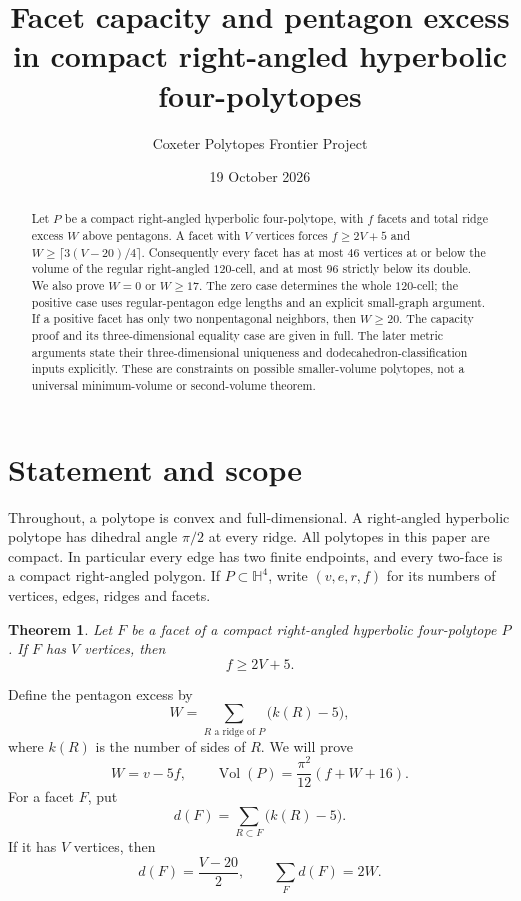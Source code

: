 \documentclass[11pt]{article}
\title{Facet capacity and pentagon excess\linebreak
in compact right-angled hyperbolic four-polytopes}
\author{Coxeter Polytopes Frontier Project}
\date{19 October 2026}
\newtheorem{theorem}{Theorem}
\theoremstyle{remark}
\newcommand{\HH}{\mathbb H}
\newcommand{\Vol}{\operatorname{Vol}}
\begin{document}
\maketitle

\begin{abstract}
Let $P$ be a compact right-angled hyperbolic four-polytope, with $f$
facets and total ridge excess $W$ above pentagons. A facet with $V$
vertices forces $f\ge2V+5$ and $W\ge\lceil3(V-20)/4\rceil$.
Consequently every facet has at most $46$ vertices at or below the volume
of the regular right-angled $120$-cell, and at most $96$ strictly below
its double. We also prove $W=0$ or $W\ge17$. The zero case determines
the whole $120$-cell; the positive case uses regular-pentagon edge
lengths and an explicit small-graph argument. If a positive facet
has only two nonpentagonal neighbors, then $W\ge20$. The capacity proof and
its three-dimensional equality case are given in full. The later
metric arguments state their three-dimensional uniqueness and
dodecahedron-classification inputs explicitly. These are constraints
on possible smaller-volume polytopes, not a universal minimum-volume
or second-volume theorem.
\end{abstract}

\section{Statement and scope}

Throughout, a polytope is convex and full-dimensional. A right-angled
hyperbolic polytope has dihedral angle $\pi/2$ at every ridge. All
polytopes in this paper are compact. In particular every edge has two
finite endpoints, and every two-face is a compact right-angled polygon.
If $P\subset\HH^4$, write $(v,e,r,f)$ for its numbers of vertices,
edges, ridges and facets.

\begin{theorem}\label{thm:capacity}
Let $F$ be a facet of a compact right-angled hyperbolic four-polytope
$P$. If $F$ has $V$ vertices, then
\begin{equation}\label{eq:capacity}
 f\ge 2V+5.
\end{equation}
\end{theorem}

Define the pentagon excess by
\[
 W=\sum_{R\text{ a ridge of }P}\bigl(k(R)-5\bigr),
\]
where $k(R)$ is the number of sides of $R$. We will prove
\begin{equation}\label{eq:volume}
 W=v-5f,\qquad
 \Vol(P)=\frac{\pi^2}{12}(f+W+16).
\end{equation}
For a facet $F$, put
\[
 d(F)=\sum_{R\subset F}\bigl(k(R)-5\bigr).
\]
If it has $V$ vertices, then
\begin{equation}\label{eq:excess-identities}
 d(F)=\frac{V-20}{2},\qquad \sum_Fd(F)=2W.
\end{equation}
\end{document}
